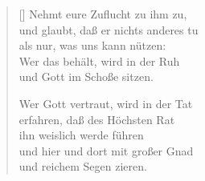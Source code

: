 \begin{multicols}{2}
\begin{verse}[\versewidth]
 Nehmt eure Zuflucht zu ihm zu,\\
und glaubt, daß er nichts anderes tu\\
als nur, was uns kann nützen:\\
Wer das behält, wird in der Ruh\\
und Gott im Schoße sitzen.

 Wer Gott vertraut, wird in der Tat\\
erfahren, daß des Höchsten Rat\\
ihn weislich werde führen\\
und hier und dort mit großer Gnad\\
und reichem Segen zieren.

\end{verse}
\end{multicols}
